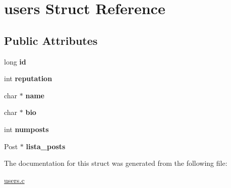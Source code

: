 \hypertarget{structusers}{}\section{users Struct Reference}
\label{structusers}
\subsection*{Public Attributes}
\begin{DoxyCompactItemize}
\item 
long {\bfseries id}\hypertarget{structusers_a261a6003e046fbc3f72e140789c07701}{}\label{structusers_a261a6003e046fbc3f72e140789c07701}

\item 
int {\bfseries reputation}\hypertarget{structusers_a9b38c635db4b5b2301011e5fcfe363b4}{}\label{structusers_a9b38c635db4b5b2301011e5fcfe363b4}

\item 
char $\ast$ {\bfseries name}\hypertarget{structusers_af8fb9c9f54844e27a607c67fcb5d557a}{}\label{structusers_af8fb9c9f54844e27a607c67fcb5d557a}

\item 
char $\ast$ {\bfseries bio}\hypertarget{structusers_adc04ad8a7d239b3fa26823f90d4a4cdd}{}\label{structusers_adc04ad8a7d239b3fa26823f90d4a4cdd}

\item 
int {\bfseries numposts}\hypertarget{structusers_ad5d6a356ec2ea5a8cee0be22f99f4a76}{}\label{structusers_ad5d6a356ec2ea5a8cee0be22f99f4a76}

\item 
Post $\ast$ {\bfseries lista\+\_\+posts}\hypertarget{structusers_a459e802ee030a842b8e044071edb8c82}{}\label{structusers_a459e802ee030a842b8e044071edb8c82}

\end{DoxyCompactItemize}


The documentation for this struct was generated from the following file\+:\begin{DoxyCompactItemize}
\item 
\hyperlink{users_8c}{users.\+c}\end{DoxyCompactItemize}
